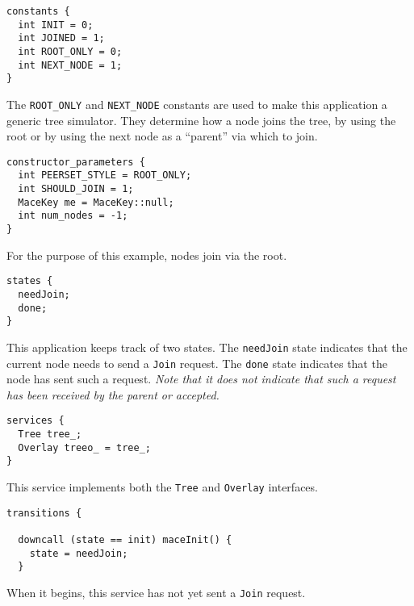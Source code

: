 \documentclass[12pt,letterpaper]{article}
\newenvironment{code}
{\begin{list}{}{\setlength{\leftmargin}{1em}}\item\scriptsize\bfseries}
{\end{list}}
\begin{document}
\begin{code}
\begin{verbatim}
constants {
  int INIT = 0;
  int JOINED = 1;
  int ROOT_ONLY = 0;
  int NEXT_NODE = 1;
}
\end{verbatim}
\end{code}

The \texttt{ROOT\_ONLY} and \texttt{NEXT\_NODE} constants are used to make this application a generic tree simulator.  They determine how a node joins the tree, by using the root or by using the next node as a ``parent'' via which to join.  

\begin{code}
\begin{verbatim}
constructor_parameters {
  int PEERSET_STYLE = ROOT_ONLY;
  int SHOULD_JOIN = 1;
  MaceKey me = MaceKey::null;
  int num_nodes = -1;
}
\end{verbatim}
\end{code}

For the purpose of this example, nodes join via the root.  

\begin{code}
\begin{verbatim}
states {
  needJoin;
  done;
}
\end{verbatim}
\end{code}

This application keeps track of two states.  The \texttt{needJoin} state indicates that the current node needs to send a \texttt{Join} request.  The \texttt{done} state indicates that the node has sent such a request.  \textit{Note that it does not indicate that such a request has been received by the parent or accepted.}

\begin{code}
\begin{verbatim}  
services {
  Tree tree_;
  Overlay treeo_ = tree_;
}
\end{verbatim}
\end{code}

This service implements both the \texttt{Tree} and \texttt{Overlay} interfaces.

\begin{code}
\begin{verbatim}
transitions {

  downcall (state == init) maceInit() {
    state = needJoin;
  } 
\end{verbatim}
\end{code}

When it begins, this service has not yet sent a \texttt{Join} request.
\end{document}
